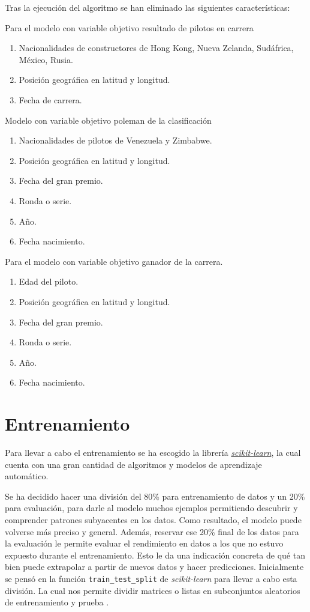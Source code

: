 Tras la ejecución del algoritmo se han eliminado las siguientes características:

Para el modelo con variable objetivo resultado de pilotos en carrera
\begin{enumerate}
    \item Nacionalidades de constructores de Hong Kong, Nueva Zelanda, Sudáfrica, México, Rusia.
    \item Posición geográfica en latitud y longitud.
    \item Fecha de carrera.
\end{enumerate}

Modelo con variable objetivo poleman de la clasificación
 \begin{enumerate}
    \item Nacionalidades de pilotos de Venezuela y Zimbabwe.
    \item Posición geográfica en latitud y longitud.
    \item Fecha del gran premio.
    \item Ronda o serie.
    \item Año.
    \item Fecha nacimiento.
\end{enumerate}

Para el modelo con variable objetivo ganador de la carrera.
 \begin{enumerate}
    \item Edad del piloto.
    \item Posición geográfica en latitud y longitud.
    \item Fecha del gran premio.
    \item Ronda o serie.
    \item Año.
    \item Fecha nacimiento.
\end{enumerate}


\section{Entrenamiento}
Para llevar a cabo el entrenamiento se ha escogido la librería \href{https://scikit-learn.org/stable/}{\textit{scikit-learn}}, la cual cuenta con una gran cantidad de algoritmos y modelos de aprendizaje automático.

Se ha decidido hacer una división del 80\% para entrenamiento de datos y un 20\% para evaluación, para darle al modelo muchos ejemplos permitiendo descubrir y comprender patrones subyacentes en los datos. Como resultado, el modelo puede volverse más preciso y general. Además, reservar ese 20\% final de los datos para la evaluación le permite evaluar el rendimiento en datos a los que no estuvo expuesto durante el entrenamiento. Esto le da una indicación concreta de qué tan bien puede extrapolar a partir de nuevos datos y hacer predicciones. 
Inicialmente se pensó en la función \texttt{train\_test\_split} de \textit{scikit-learn} para llevar a cabo esta división. La cual nos permite dividir matrices o listas en subconjuntos aleatorios de entrenamiento y prueba \cite{sklearn:traintestsplit}.

